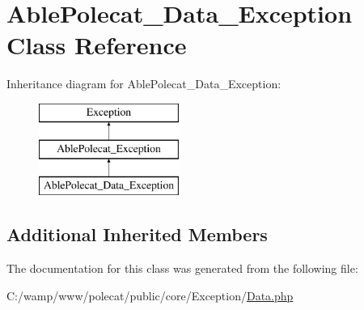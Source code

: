 \hypertarget{class_able_polecat___data___exception}{}\section{Able\+Polecat\+\_\+\+Data\+\_\+\+Exception Class Reference}
\label{class_able_polecat___data___exception}
Inheritance diagram for Able\+Polecat\+\_\+\+Data\+\_\+\+Exception\+:\begin{figure}[H]
\begin{center}
\leavevmode
\includegraphics[height=3.000000cm]{class_able_polecat___data___exception}
\end{center}
\end{figure}
\subsection*{Additional Inherited Members}


The documentation for this class was generated from the following file\+:\begin{DoxyCompactItemize}
\item 
C\+:/wamp/www/polecat/public/core/\+Exception/\hyperlink{_exception_2_data_8php}{Data.\+php}\end{DoxyCompactItemize}
